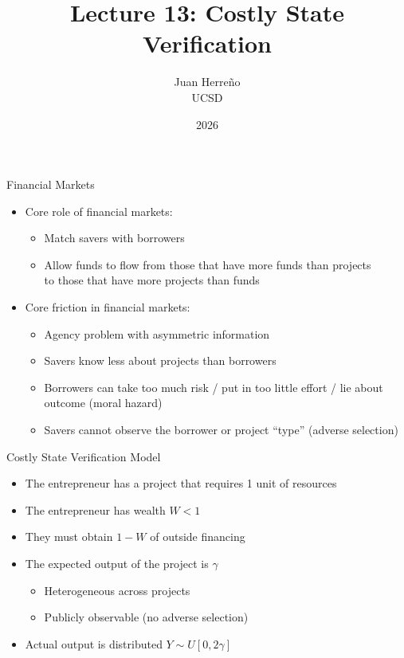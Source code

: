 \documentclass[11pt,aspectratio=169,xcolor={dvipsnames},hyperref={pdftex,pdfpagemode=UseNone,hidelinks,pdfdisplaydoctitle=true},usepdftitle=false]{beamer}
\title{Lecture 13: Costly State Verification}
\author{Juan Herre\~{n}o\\UCSD}
\date{2026}
\begin{document}
\maketitle


\begin{frame}{Financial Markets}
\begin{itemize}
	\itemsep1em 
	\item Core role of financial markets:
	\begin{itemize}
		\item Match savers with borrowers
		\item Allow funds to flow from those that have more funds than projects \\ to those that have more projects than funds
	\end{itemize}
	\item Core friction in financial markets:
	\begin{itemize}
		\item Agency problem with asymmetric information
		\item Savers know less about projects than borrowers
		\item Borrowers can take too much risk / put in too little effort / lie about outcome (moral hazard)
\item Savers cannot observe the borrower or project ``type'' (adverse selection)
	\end{itemize}
\end{itemize}
\end{frame}


\begin{frame}{Costly State Verification Model}
\begin{itemize}
	\itemsep1em 
\item The entrepreneur has a project that requires 1 unit of resources
\item The entrepreneur has wealth $W<1$
\item They must obtain $1-W$ of outside financing
\item The expected output of the project is $\gamma$
	\begin{itemize}
		\item Heterogeneous across projects
		\item Publicly observable (no adverse selection) 
	\end{itemize}
	\item Actual output is distributed $Y \sim U [0, 2\gamma]$	
\end{itemize}
\end{frame}
\end{document}
